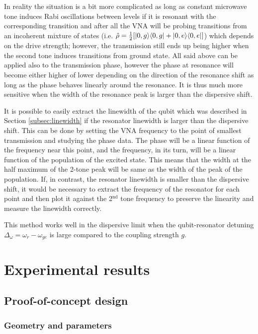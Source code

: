 \documentclass[12pt, twoside]{report}
\DeclarePairedDelimiter\bra{\langle}{\rvert}
\DeclarePairedDelimiter\ket{\lvert}{\rangle}
\numberwithin{equation}{section}
\begin{document}
In reality the situation is a bit more complicated as long as constant microwave tone induces Rabi oscillations between levels if it is resonant with the corresponding transition and after all the VNA will be probing transitions from an incoherent mixture of states (i.e. $\hat \rho = \frac{1}{2} [\ket{0, g}\bra{0,g} + \ket{0, e}\bra{0,e}]$) which depends on the drive strength; however, the transmission still ends up being higher when the second tone induces transitions from ground state. All said above can be applied also to the transmission phase, however the phase at resonance will become either higher of lower depending on the direction of the resonance shift as long as the phase behaves linearly around the resonance. It is thus much more sensitive when the width of the resonance peak is larger than the dispersive shift. 

It is possible to easily extract the linewidth of the qubit which was described in Section \ref{subsec:linewidth} if the resonator linewidth is larger than the dispersive shift. This can be done by setting the VNA frequency to the point of smallest transmission and studying the phase data. The phase will be a linear function of the frequency near this point, and the frequency, in its turn, will be a linear function of the population of the excited state. This means that the width at the half maximum of the 2-tone peak will be same as the width of the peak of the population. If, in contrast, the resonator linewidth is smaller than the dispersive shift, it would be necessary to extract the frequency of the resonator for each point and then plot it against the 2$^{\text{nd}}$ tone frequency to preserve the linearity and measure the linewidth correctly.

This method works well in the dispersive limit when the qubit-resonator detuning $\Delta_\omega = \omega_r - \omega_{ge}$ is large compared to the coupling strength $g$.

\chapter{Experimental results}

\section{Proof-of-concept design}

\subsection{Geometry and parameters}
\end{document}
